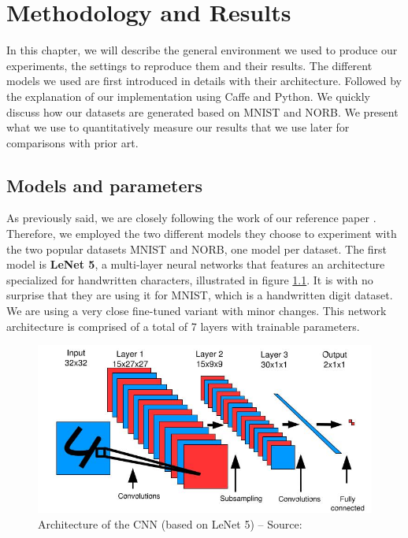 \documentclass[a4paper,12pt]{report}
\begin{document}
\chapter{Methodology and Results}

In this chapter, we will describe the general environment we used to produce our experiments, the settings to reproduce them and their results.
The different models we used are first introduced in details with their architecture.
Followed by the explanation of our implementation using Caffe and Python.
We quickly discuss how our datasets are generated based on MNIST and NORB.
We present what we use to quantitatively measure our results that we use later for comparisons with prior art.

\section{Models and parameters}

As previously said, we are closely following the work of our reference paper \cite{hadsell2006dimensionality}.
Therefore, we employed the two different models they choose to experiment with the two popular datasets MNIST and NORB, one model per dataset.
The first model is {\bf LeNet 5}, a multi-layer neural networks that features an architecture specialized for handwritten characters, illustrated in figure \ref{fig:siamese_cnn}.
It is with no surprise that they are using it for MNIST, which is a handwritten digit dataset.
We are using a very close fine-tuned variant with minor changes.
This network architecture is comprised of a total of 7 layers with trainable parameters.

\begin{figure}[h]
    \begin{center}
        \includegraphics{thesis_figures/siamese_cnn.jpg}
    \end{center}
    \caption{Architecture of the CNN (based on LeNet 5) -- Source: \cite{hadsell2006dimensionality}}
    \label{fig:siamese_cnn}
\end{figure}
\end{document}
